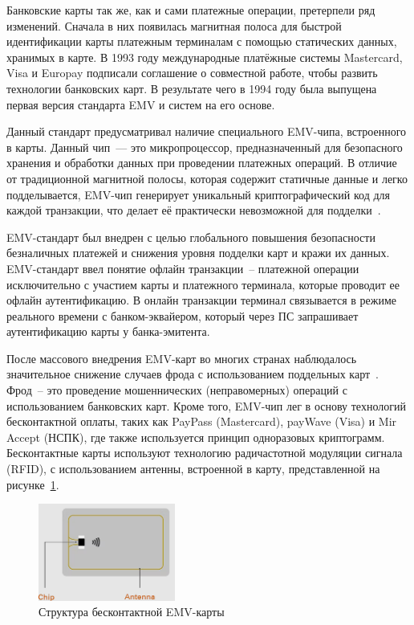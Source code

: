 Банковские карты так же, как и сами платежные операции, претерпели ряд изменений.
Сначала в них появилась магнитная полоса для быстрой идентификации карты платежным терминалам с помощью статических данных, хранимых в карте.
В 1993 году международные платёжные системы Mastercard, Visa и Europay подписали соглашение о совместной работе, чтобы развить технологии банковских карт.
В результате чего в 1994 году была выпущена первая версия стандарта EMV и систем на его основе.

Данный стандарт предусматривал наличие специального EMV-чипа, встроенного в карты.
Данный чип~--- это микропроцессор, предназначенный для безопасного хранения и обработки данных при проведении платежных операций.
В отличие от традиционной магнитной полосы, которая содержит статичные данные и легко подделывается, EMV-чип генерирует уникальный криптографический код для каждой транзакции, что делает её практически невозможной для подделки~\cite{emv_specifications_book}.

EMV-стандарт был внедрен с целью глобального повышения безопасности безналичных платежей и снижения уровня подделки карт и кражи их данных.
EMV-стандарт ввел понятие офлайн транзакции~-- платежной операции исключительно с участием карты и платежного терминала, которые проводит ее офлайн аутентификацию.
В онлайн транзакции терминал связывается в режиме реального времени с банком-эквайером, который через ПС запрашивает аутентификацию карты у банка-эмитента.

После массового внедрения EMV-карт во многих странах наблюдалось значительное снижение случаев фрода с использованием поддельных карт~\cite{plas_emv_fraud}.
Фрод~-- это проведение мошеннических (неправомерных) операций с использованием банковских карт.
Кроме того, EMV-чип лег в основу технологий бесконтактной оплаты, таких как PayPass (Mastercard), payWave (Visa) и Mir Accept (НСПК), где также используется принцип одноразовых криптограмм.
Бесконтактные карты используют технологию радичастотной модуляции сигнала (RFID), с использованием антенны, встроенной в карту, представленной на рисунке~\ref{fig:emv_card}.

\begin{figure}[H]
    \centering
    \includegraphics[width=0.4\textwidth]{images/research/emv_card}
    \caption{\centering Структура бесконтактной EMV-карты}
    \label{fig:emv_card}
\end{figure}


